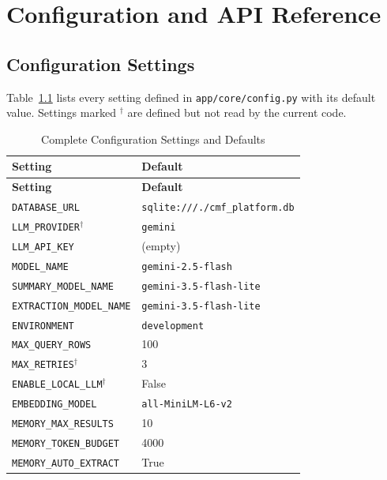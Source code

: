\appendix

\chapter{Configuration and API Reference}
\label{app:config}

\section{Configuration Settings}
Table~\ref{tab:full_config} lists every setting defined in \texttt{app/core/config.py}
with its default value. Settings marked $^\dagger$ are defined but not read by the current
code.

\begingroup
\small
\begin{longtable}{p{7.2cm} p{7.6cm}}
    \caption{Complete Configuration Settings and Defaults}
    \label{tab:full_config} \\
    \toprule
    \textbf{Setting} & \textbf{Default} \\
    \midrule
    \endfirsthead
    \toprule
    \textbf{Setting} & \textbf{Default} \\
    \midrule
    \endhead
    \texttt{DATABASE\_URL}                  & \texttt{sqlite:///./cmf\_platform.db} \\
    \texttt{LLM\_PROVIDER}$^\dagger$        & \texttt{gemini} \\
    \texttt{LLM\_API\_KEY}                  & (empty) \\
    \texttt{MODEL\_NAME}                    & \texttt{gemini-2.5-flash} \\
    \texttt{SUMMARY\_MODEL\_NAME}           & \texttt{gemini-3.5-flash-lite} \\
    \texttt{EXTRACTION\_MODEL\_NAME}        & \texttt{gemini-3.5-flash-lite} \\
    \texttt{ENVIRONMENT}                    & \texttt{development} \\
    \texttt{MAX\_QUERY\_ROWS}               & 100 \\
    \texttt{MAX\_RETRIES}$^\dagger$         & 3 \\
    \texttt{ENABLE\_LOCAL\_LLM}$^\dagger$   & False \\
    \texttt{EMBEDDING\_MODEL}               & \texttt{all-MiniLM-L6-v2} \\
    \texttt{MEMORY\_MAX\_RESULTS}           & 10 \\
    \texttt{MEMORY\_TOKEN\_BUDGET}          & 4000 \\
    \texttt{MEMORY\_AUTO\_EXTRACT}          & True \\

\end{longtable}
